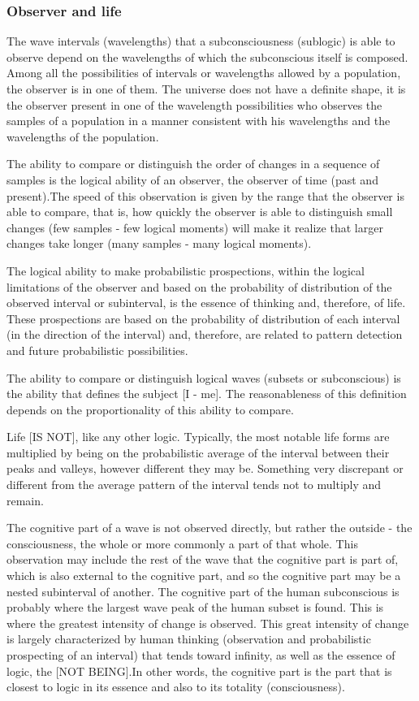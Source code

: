 \subsubsection{Observer and life}
The wave intervals (wavelengths) that a subconsciousness (sublogic) is able to observe depend on the wavelengths of which the subconscious itself is composed. Among all the possibilities of intervals or wavelengths allowed by a population, the observer is in one of them. The universe does not have a definite shape, it is the observer present in one of the wavelength possibilities who observes the samples of a population in a manner consistent with his wavelengths and the wavelengths of the population.

The ability to compare or distinguish the order of changes in a sequence of samples is the logical ability of an observer, the observer of time (past and present).The speed of this observation is given by the range that the observer is able to compare, that is, how quickly the observer is able to distinguish small changes (few samples - few logical moments) will make it realize that larger changes take longer (many samples - many logical moments).

The logical ability to make probabilistic prospections, within the logical limitations of the observer and based on the probability of distribution of the observed interval or subinterval, is the essence of thinking and, therefore, of life. These prospections are based on the probability of distribution of each interval (in the direction of the interval) and, therefore, are related to pattern detection and future probabilistic possibilities.

The ability to compare or distinguish logical waves (subsets or subconscious) is the ability that defines the subject [I - me]. The reasonableness of this definition depends on the proportionality of this ability to compare.

Life [IS NOT], like any other logic. Typically, the most notable life forms are multiplied by being on the probabilistic average of the interval between their peaks and valleys, however different they may be. Something very discrepant or different from the average pattern of the interval tends not to multiply and remain.

The cognitive part of a wave is not observed directly, but rather the outside - the consciousness, the whole or more commonly a part of that whole. This observation may include the rest of the wave that the cognitive part is part of, which is also external to the cognitive part, and so the cognitive part may be a nested subinterval of another. The cognitive part of the human subconscious is probably where the largest wave peak of the human subset is found. This is where the greatest intensity of change is observed. This great intensity of change is largely characterized by human thinking (observation and probabilistic prospecting of an interval) that tends toward infinity, as well as the essence of logic, the [NOT BEING].In other words, the cognitive part is the part that is closest to logic in its essence and also to its totality (consciousness).

